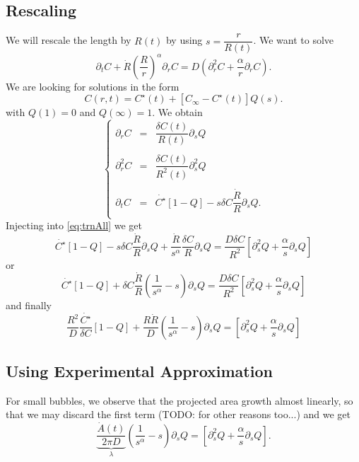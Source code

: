 \documentclass[11pt]{revtex4}
\begin{document}
\subsection{Rescaling}
We will rescale the length by $R(t)$ by using $s=\dfrac{r}{R(t)}$.
We want to solve
\begin{equation}
	\label{eq:trnAll}
	\partial_t C + \dot{R}\left(\dfrac{R}{r}\right)^\alpha \partial_r C = D\left(\partial_r^2 C+ \dfrac{\alpha}{r} \partial_r C \right).
\end{equation}
We are looking for solutions in the form
\begin{equation}
	C(r,t) = C^\star(t) + \left[ C_\infty - C^\star(t)\right] Q(s).
\end{equation}
with $Q(1)=0$ and $Q(\infty)=1$.
We obtain
$$
	\left\lbrace
	\begin{array}{rcl}
	\partial_r C   & = & \dfrac{\delta C(t)}{R(t)}\partial_s Q\\
	\\
	\partial_r^2 C & = & \dfrac{\delta C(t)}{R^2(t)}\partial_s^2 Q\\
	\\
	\partial_t  C  & = & \dot{C^\star}\left[1-Q\right] - s \delta C  \dfrac{\dot{R}}{R} \partial_s Q.\\
	\end{array}
	\right.
$$
Injecting into \eqref{eq:trnAll} we get
$$
	\dot{C^\star}\left[1-Q\right] - s \delta C  \dfrac{\dot{R}}{R} \partial_s Q
	+ \dfrac{\dot{R}}{s^\alpha}  \dfrac{\delta C}{R}\partial_s Q = \dfrac{D\delta C}{R^2}\left[ \partial_s^2 Q + \dfrac{\alpha}{s}\partial_s Q\right]
$$
or
$$
	\dot{C^\star}\left[1-Q\right] + \delta C \dfrac{\dot{R}}{R} \left( \dfrac{1}{s^\alpha} -s \right) \partial_s Q = \dfrac{D\delta C}{R^2}\left[ \partial_s^2 Q + \dfrac{\alpha}{s}\partial_s Q\right]
$$
and finally
\begin{equation}
	\dfrac{R^2}{D} \dfrac{\dot{C^\star}}{\delta C} \left[1-Q\right] + \dfrac{R\dot{R}}{D} \left( \dfrac{1}{s^\alpha} -s \right) \partial_s Q = \left[ \partial_s^2 Q + \dfrac{\alpha}{s}\partial_s Q\right]
\end{equation}

\subsection{Using Experimental Approximation}
For small bubbles, we observe that the projected area growth almost linearly, so that we may discard the first term (TODO: for other reasons too...)
and we get
\begin{equation}
	\underbrace{\dfrac{\dot{A}(t)}{2\pi D}}_{\lambda} \left( \dfrac{1}{s^\alpha} -s \right) \partial_s Q = \left[ \partial_s^2 Q + \dfrac{\alpha}{s}\partial_s Q\right].
\end{equation}
\end{document}
